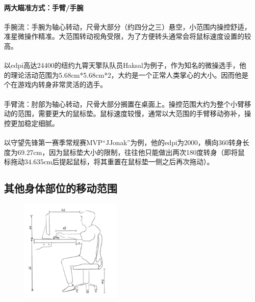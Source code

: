 \documentclass[UTF8]{ctexart}
\begin{document}
\paragraph{两大瞄准方式：手臂/手腕}
    \paragraph{}手腕流：手腕为轴心转动，尺骨大部分（约四分之三）悬空，小范围内操控舒适，准星微操作精准。大范围转动视角受限，为了方便转头通常会将鼠标速度设置的较高。
    \paragraph{}
    以edpi高达24400的纽约九霄天擎队队员Haksal为例子，作为知名的微操选手，他的理论活动范围为5.68cm*5.68cm*2，大约是一个正常人类掌心的大小。因而他是个在游戏内转身非常灵活的选手。
    \paragraph{}
    手臂流：肘部为轴心转动，尺骨大部分搁置在桌面上。操控范围大约为整个小臂移动的范围，需要更大的鼠标垫。鼠标速度较慢，通常以大范围的手臂移动弥补，操控更加稳定细腻。
    \paragraph{}
    以守望先锋第一赛季常规赛MVP“JJonak”为例，他的edpi为2000，横向360转身长度为69.27cm，因为鼠标垫大小的限制，往往他只能做出两次180度转身（即将鼠标拖动34.635cm后提起鼠标，将其重置在鼠标垫一侧之后再次拖动）。
    \cite{zhihu_liupai}
\subsection{其他身体部位的移动范围}
    \begin{figure}[htbp]
    \centering
    \includegraphics[width=0.45\textwidth]{desktop.jpg}
    \end{figure}
\end{document}
